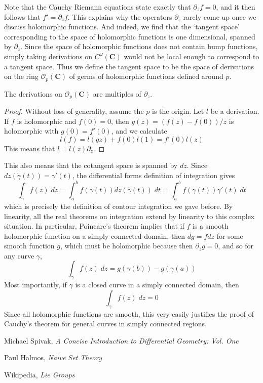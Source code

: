Note that the Cauchy Riemann equations state exactly that $\partial_{\overline{z}} f = 0$, and it then follows that $f' = \partial_z f$. This explains why the operators $\partial_{\overline{z}}$ rarely come up once we discuss holomorphic functions. And indeed, we find that the `tangent space' corresponding to the space of holomorphic functions is one dimensional, spanned by $\partial_z$. Since the space of holomorphic functions does not contain bump functions, simply taking derivations on $C^\omega(\mathbf{C})$ would not be local enough to correspond to a tangent space. Thus we define the tangent space to be the space of derivations on the ring $\mathcal{O}_p(\mathbf{C})$ of germs of holomorphic functions defined around $p$.

\begin{theorem}
    The derivations on $\mathcal{O}_p(\mathbf{C})$ are multiples of $\partial_z$.
\end{theorem}
\begin{proof}
    Without loss of generality, assume the $p$ is the origin. Let $l$ be a derivation. If $f$ is holomorphic and $f(0) = 0$, then $g(z) = (f(z) - f(0))/z$ is holomorphic with $g(0) = f'(0)$, and we calculate
    \[ l(f) = l(gz) + f(0)l(1) = f'(0)l(z) \]
    This means that $l = l(z) \partial_z$.
\end{proof}

This also means that the cotangent space is spanned by $dz$. Since $dz(\dot{\gamma}(t)) = \gamma'(t)$, the differential forms definition of integration gives
%
\[ \int_\gamma f(z)\; dz = \int_a^b f(\gamma(t)) dz \left(\dot{\gamma}(t) \right)\; dt = \int_a^b f(\gamma(t)) \gamma'(t)\; dt \]
%
which is precisely the definition of contour integration we gave before. By linearity, all the real theorems on integration extend by linearity to this complex situation. In particular, Poincare's theorem implies that if $f$ is a smooth holomorphic function on a simply connected domain, then $dg = f dz$ for some smooth function $g$, which must be holomorphic because then $\partial_{\overline{z}} g = 0$, and so for any curve $\gamma$,
%
\[ \int_\gamma f(z)\; dz = g(\gamma(b)) - g(\gamma(a)) \]
%
Most importantly, if $\gamma$ is a closed curve in a simply connected domain, then
%
\[ \int_\gamma f(z)\; dz = 0 \]
%
Since all holomorphic functions are smooth, this very easily justifies the proof of Cauchy's theorem for general curves in simply connected regions.













\begin{thebibliography}{10}
     Michael Spivak,
    \emph{A Concise Introduction to Differential Geometry: Vol. One}

     Paul Halmos,
    \emph{Naive Set Theory}

     Wikipedia,
    \emph{Lie Groups}
\end{thebibliography}

